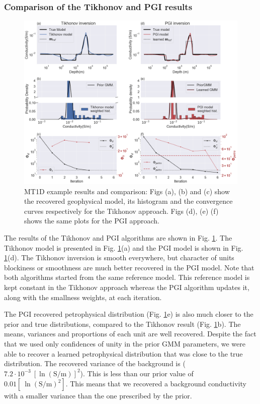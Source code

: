 \documentclass[extra]{gji} %
\begin{document}
\subsubsection{Comparison of the Tikhonov and PGI results}

\begin{figure}
 \centering
 \includegraphics[width=\textwidth]{Fig/LowRes/MT1D_Results.png}
    \caption[]{MT1D example results and comparison: Figs (a), (b) and (c) show the recovered geophysical model, its histogram and the convergence curves respectively for the Tikhonov approach. Figs (d), (e) (f) shows the same plots for the PGI approach.}
 \label{fig:MT1D_smooth}
\end{figure}

The results of the Tikhonov and PGI algorithms are shown in Fig. \ref{fig:MT1D_smooth}. The Tikhonov model is presented in Fig. \ref{fig:MT1D_smooth}(a) and the PGI model is shown in Fig. \ref{fig:MT1D_smooth}(d). The Tikhonov inversion is smooth everywhere, but character of  units blockiness or smoothness are much better recovered in the PGI model. Note that both algorithms started from the same reference model. This reference model is kept constant in the Tikhonov approach whereas the PGI algorithm updates it, along with the smallness weights, at each iteration.

The PGI recovered petrophysical distribution (Fig. \ref{fig:MT1D_smooth}e) is also much closer to the prior and true distributions, compared to the Tikhonov result (Fig. \ref{fig:MT1D_smooth}b). The means, variances and proportions of each unit are well recovered. Despite the fact that we used only confidences of unity in the prior GMM parameters, we were able to recover a learned petrophysical distribution that was close to the true distribution. The recovered variance of the background is ($7.2 \cdot 10^{-3}~[\ln(\text{S/m})]^2$). This is less than our prior value of $0.01[~\ln(\text{S/m})^2]$. This means that we recovered a background conductivity with a smaller variance than the one prescribed by the prior.
\end{document}
